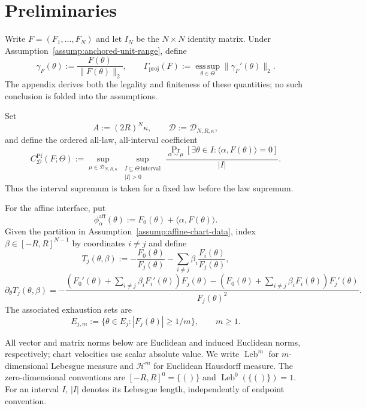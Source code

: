 \section{Preliminaries}
\label{sec:prelim}

Write $F=(F_1,\ldots,F_N)$ and let $I_N$ be the $N\times N$ identity
matrix.  Under Assumption~\ref{assump:anchored-unit-range}, define
\[
\gamma_F(\theta):=\frac{F(\theta)}{\|F(\theta)\|_2},
\qquad
\Gamma_{\mathrm{proj}}(F)
:=\operatorname*{ess\,sup}_{\theta\in\Theta}
  \|\gamma_F'(\theta)\|_2.
\]
The appendix derives both the legality and finiteness of these quantities; no
such conclusion is folded into the assumptions.

Set
\[
A:=(2R)^N\kappa,
\qquad
\mathcal D:=\mathcal D_{N,R,\kappa},
\]
and define the ordered all-law, all-interval coefficient
\[
C^{\mathrm{Pf}}_{\mathcal D}(F;\Theta)
:=\sup_{\mu\in\mathcal D_{N,R,\kappa}}
  \sup_{\substack{I\subseteq\Theta\ \mathrm{interval}\\|I|>0}}
  \frac{\Pr_{\alpha\sim\mu}
  [\exists\theta\in I:\langle\alpha,F(\theta)\rangle=0]}{|I|}.
\]
Thus the interval supremum is taken for a fixed law before the law supremum.

For the affine interface, put
\[
\phi^{\mathrm{aff}}_\alpha(\theta)
:=F_0(\theta)+\langle\alpha,F(\theta)\rangle.
\]
Given the partition in Assumption~\ref{assump:affine-chart-data}, index
$\beta\in[-R,R]^{N-1}$ by coordinates $i\neq j$ and define
\[
T_j(\theta,\beta)
:=-\frac{F_0(\theta)}{F_j(\theta)}
  -\sum_{i\neq j}\beta_i\frac{F_i(\theta)}{F_j(\theta)},
\]
\[
\partial_\theta T_j(\theta,\beta)
=-\frac{
\left(F_0'(\theta)+\sum_{i\neq j}\beta_iF_i'(\theta)\right)F_j(\theta)
-\left(F_0(\theta)+\sum_{i\neq j}\beta_iF_i(\theta)\right)F_j'(\theta)
}{F_j(\theta)^2}.
\]
The associated exhaustion sets are
\[
E_{j,m}:=\{\theta\in E_j:|F_j(\theta)|\geq1/m\},
\qquad m\geq1.
\]

All vector and matrix norms below are Euclidean and induced Euclidean norms,
respectively; chart velocities use scalar absolute value.  We write
$\operatorname{Leb}^m$ for $m$-dimensional Lebesgue measure and
$\mathcal H^m$ for Euclidean Hausdorff measure.  The zero-dimensional
conventions are $[-R,R]^0=\{()\}$ and
$\operatorname{Leb}^0(\{()\})=1$.  For an interval $I$, $|I|$ denotes its
Lebesgue length, independently of endpoint convention.
